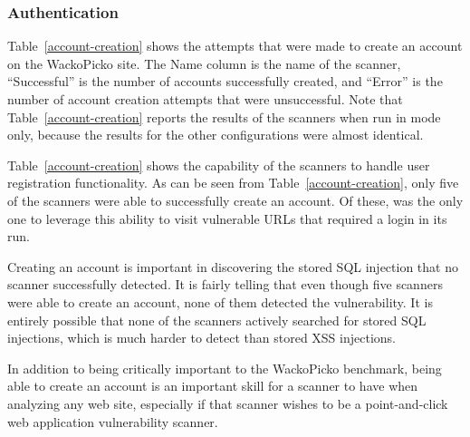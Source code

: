 
\subsubsection{Authentication}
\label{ability-create-account}

Table~\ref{account-creation} shows the attempts that were made to
create an account on the WackoPicko site. The Name column is the name
of the scanner, ``Successful'' is the number of accounts successfully
created, and ``Error'' is the number of account creation attempts that
were unsuccessful. Note that
Table~\ref{account-creation} reports the results of the scanners when run in
\initial{} mode only, because the results for the other configurations were
almost identical.

Table~\ref{account-creation} shows the capability of
the scanners to handle user registration functionality. As can be seen from
Table~\ref{account-creation}, only five of the scanners were able to successfully
create an account. Of these, \hailstorm{} was the only one to leverage
this ability to visit vulnerable URLs that required a login in its
\initial{} run.

Creating an account is important in discovering the stored SQL injection that
no scanner successfully detected. It is fairly telling that even though five
scanners were able to create an account, none of them detected the vulnerability. It
is entirely possible that none of the scanners actively searched for stored SQL
injections, which is much harder to detect than stored XSS injections. 


In addition to being critically important to the WackoPicko benchmark, being
able to create an account is an important skill for a scanner to have when
analyzing any web site, especially if that scanner wishes to be a
point-and-click web application vulnerability scanner. 

